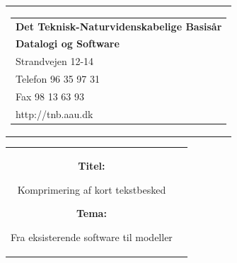 \begin{titlepage}
\small
\begin{nopagebreak}
{\samepage 
\begin{tabular}{r}
\parbox{\textwidth}{  
\hfill \begin{tabular}{l}
{\sf\small \textbf{Det Teknisk-Naturvidenskabelige Basis{\aa}r }}\\
{\sf\small  \textbf{Datalogi og Software}} \\
{\sf\small Strandvejen 12-14} \\
{\sf\small Telefon 96 35 97 31} \\
{\sf\small Fax 98 13 63 93} \\
{\sf\small http://tnb.aau.dk}
\end{tabular}}
\\
\end{tabular}

\begin{tabular}{cc}
\parbox{7cm}{
\begin{description}

\item {\bf Titel:} 

Komprimering af kort tekstbesked
  
\item {\bf Tema:} 

Fra eksisterende software til modeller

\end{description}

\parbox{8cm}{

}}
\end{tabular}}
\end{nopagebreak}
\end{titlepage}
